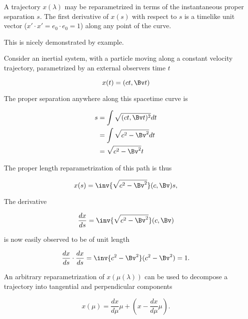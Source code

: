 A trajectory $x(\lambda)$ may be reparametrized in terms of the instantaneous proper separation $s$.  The first derivative of $x(s)$ with respect to $s$ is a timelike unit vector ($x' \cdot x' = e_0 \cdot e_0 = 1$) along any point of the curve.

This is nicely demonstrated by example.

Consider an inertial system, with a particle moving along a constant velocity trajectory, parametrized by an external observers time $t$

\begin{equation}\label{eqn:gramSchmidtLorentz:440}
x(t) = (c t, \Bv t)
\end{equation}

The proper separation anywhere along this spacetime curve is

\begin{equation}\label{eqn:gramSchmidtLorentz:460}
\begin{aligned}
s
&= \int \sqrt{(c t, \Bv t)^2} dt  \\
&= \int \sqrt{ c^2 - \Bv^2 } dt  \\
&= \sqrt{ c^2 - \Bv^2 } t
\end{aligned}
\end{equation}

The proper length reparametrization of this path is thus

\begin{equation}\label{eqn:gramSchmidtLorentz:480}
x(s) = \inv{\sqrt{c^2 - \Bv^2}} (c, \Bv) s,
\end{equation}

The derivative

\begin{equation}\label{eqn:gramSchmidtLorentz:500}
\frac{dx}{ds} = \inv{\sqrt{c^2 - \Bv^2}} (c, \Bv)
\end{equation}

is now easily observed to be of unit length

\begin{equation}\label{eqn:gramSchmidtLorentz:520}
\frac{dx}{ds} \cdot \frac{dx}{ds} 
= \inv{c^2 - \Bv^2} (c^2 - \Bv^2) = 1.
\end{equation}

An arbitrary reparametrization of $x(\mu(\lambda))$ can be used to decompose a trajectory into tangential and perpendicular components

\begin{equation}\label{eqn:gramSchmidtLorentz:540}
x(\mu) = \frac{dx}{d\mu} \mu + \left( x - \frac{dx}{d\mu} \mu \right).
\end{equation}

